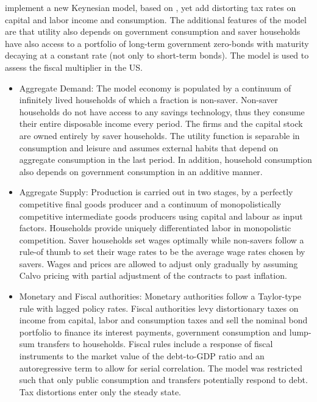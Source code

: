\documentclass[11pt,a4paper]{article}
\begin{document}
	\cite{leeper2017traum} implement a new Keynesian model, based on \cite{SmetsWouters2007,SmetsWouters2003}, yet add distorting tax rates on capital and labor income and consumption. The additional features of the model are that utility also depends on government consumption and saver households have also access to a portfolio of long-term government zero-bonds with maturity decaying at a constant rate (not only to short-term bonds). The model is used to assess the fiscal multiplier in the US.
	
	\begin{itemize}
		
		\item Aggregate Demand: The model economy is populated by a continuum of infinitely lived households of which a fraction is non-saver. Non-saver households do not have access to any savings technology, thus they consume their entire disposable income every period. The firms and the capital stock are owned entirely by saver households. The utility function is separable in consumption and leisure and assumes external habits that depend on aggregate consumption in the last period. In addition, household consumption also depends on government consumption in an additive manner.
		
		\item Aggregate Supply: Production is carried out in two stages, by a perfectly competitive final goods producer and a continuum of monopolistically competitive intermediate goods producers using capital and labour as input factors. Households provide uniquely differentiated labor in monopolistic competition. Saver households set wages optimally while non-savers follow a rule-of thumb to set their wage rates to be the average wage rates chosen by savers. Wages and prices are allowed to adjust only gradually by assuming Calvo pricing with partial adjustment of the contracts to past inflation.
		
		\item Monetary and Fiscal authorities: Monetary authorities follow a Taylor-type rule with lagged policy rates. Fiscal authorities levy distortionary taxes on income from capital, labor and consumption taxes and sell the nominal bond portfolio to finance its interest payments, government consumption and lump-sum transfers to households. Fiscal rules include a response of fiscal instruments to the market value of the debt-to-GDP ratio and an autoregressive term to allow for serial correlation. The model was restricted such that only public consumption and transfers potentially respond to debt. Tax distortions enter only the steady state.
		

\end{itemize}
\end{document}
